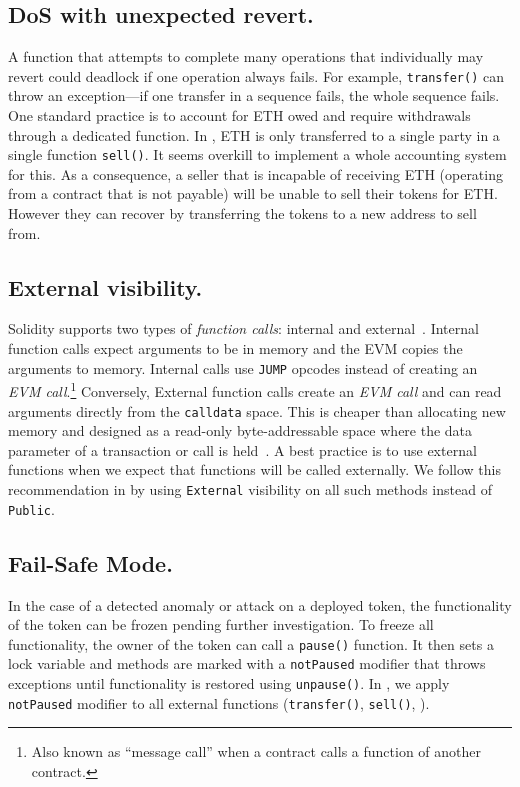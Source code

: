 \subsection{DoS with unexpected revert.}

A function that attempts to complete many operations that individually may revert could deadlock if one operation always fails. For example, \texttt{transfer()} can throw an exception---if one transfer in a sequence fails, the whole sequence fails. One standard practice is to account for ETH owed and require withdrawals through a dedicated function. In \sys, ETH is only transferred to a single party in a single function \texttt{sell()}. It seems overkill to implement a whole accounting system for this. As a consequence, a seller that is incapable of receiving ETH (\eg operating from a contract that is not payable) will be unable to sell their tokens for ETH. However they can recover by transferring the tokens to a new address to sell from. 

\subsection{External visibility.}\label{subsec:external}

Solidity supports two types of \textit{function calls}: internal and external~\cite{SolidityDoc}. Internal function calls expect arguments to be in memory and the EVM copies the arguments to memory. Internal calls use \texttt{JUMP} opcodes instead of creating an \textit{EVM call}.\footnote{Also known as ``message call'' when a contract calls a function of another contract.} Conversely, External function calls create an \textit{EVM call} and can read arguments directly from the \texttt{calldata} space. This is cheaper than allocating new memory and designed as a read-only byte-addressable space where the data parameter of a transaction or call is held~\cite{EthInDepth}. A best practice is to use external functions when we expect that functions will be called externally. We follow this recommendation in \sys by using \texttt{External} visibility on all such methods instead of \texttt{Public}. 

\subsection{Fail-Safe Mode.}

In the case of a detected anomaly or attack on a deployed \erc token, the functionality of the token can be frozen pending further investigation. To freeze all functionality, the owner of the token can call a \texttt{pause()} function. It then sets a lock variable and methods are marked with a \texttt{notPaused} modifier that throws exceptions until functionality is restored using \texttt{unpause()}. In \sys, we apply \texttt{notPaused} modifier to all external functions (\eg \texttt{transfer()}, \texttt{sell()}, \etc).

